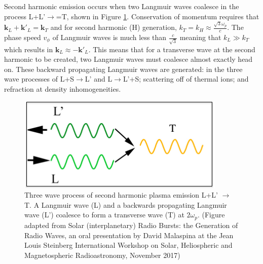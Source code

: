 Second harmonic emission occurs when two Langmuir waves coalesce in the process L+L'$\rightarrow$=T, shown in Figure \ref{fig:Hemission}. Conservation of momentum requires that $\mathbf{k}_L + \mathbf{k'}_L = \mathbf{k}_T$ and for second harmonic (H) generation, $k_T=k_H \approx \frac{\sqrt{3} \omega_p}{c}$. The phase speed $v_\phi$ of Langmuir waves is much less than $\frac{c}{\sqrt{3}}$ meaning that $k_L \gg k_T$ which results in $\mathbf{k}_L \approx -\mathbf{k'}_L$. This means that for a transverse wave at the second harmonic to be created, two Langmuir waves must coalesce almost exactly head on. These backward propagating Langmuir waves are generated: in the three wave processes of L+S$\rightarrow$L' and L$\rightarrow$L'+S; scattering off of thermal ions; and refraction at density inhomogeneities.
 \begin{figure}

     \centering
     \includegraphics[width=0.5\columnwidth]{Images/Harmonic_emission_Lwaves.png}
     \caption[Three wave process of second harmonic plasma emission L+L' $\rightarrow$ T]{Three wave process of second harmonic plasma emission L+L' $\rightarrow$ T. A Langmuir wave (L) and a backwards propagating Langmuir wave (L') coalesce to form a transverse wave (T) at $2 \omega_p$. (Figure adapted from Solar (interplanetary) Radio Bursts: the Generation of Radio Waves,	an oral presentation by David Malaspina at the Jean Louis Steinberg International Workshop on Solar, Heliospheric and Magnetospheric Radioastronomy, November 2017)}
     \label{fig:Hemission}
 \end{figure}